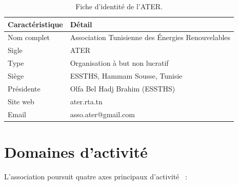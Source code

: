 \documentclass[12pt,a4paper,oneside]{report}
\begin{document}
\begin{table}[htbp]\centering

\begin{tabular}{@{}ll@{}}

\toprule

\textbf{Caract\'{e}ristique} & \textbf{D\'{e}tail} \\

\midrule

Nom complet & Association Tunisienne des \'{E}nergies Renouvelables \\

Sigle & ATER \\

Type & Organisation \`{a} but non lucratif \\

Si\`{e}ge & ESSTHS, Hammam Sousse, Tunisie \\

Pr\'{e}sidente & Olfa Bel Hadj Brahim (ESSTHS) \\

Site web & ater.rta.tn \\

Email & asso.ater@gmail.com \\

\bottomrule

\end{tabular}

\caption{Fiche d'identit\'{e} de l'ATER.}\label{fig:fiche_ater}

\end{table}



\section{Domaines d'activit\'{e}}



L'association poursuit quatre axes principaux d'activit\'{e}~\cite{ater_website} :
\end{document}

